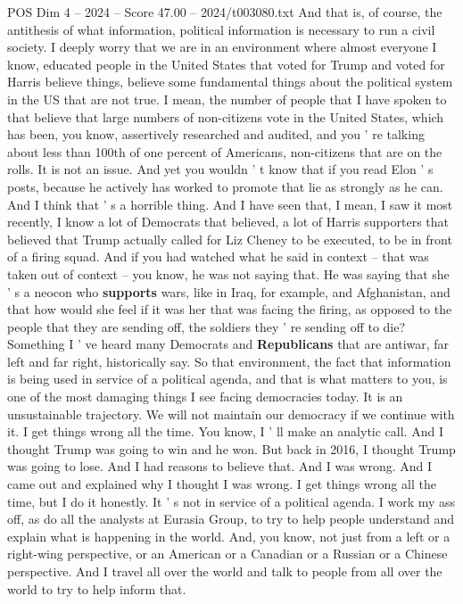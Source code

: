 \begin{textsample}{POS Dim 4 – 2024 – Score 47.00 – 2024/t003080.txt}
And that is, of course, the antithesis of what information, political information is necessary to run a civil society.
I deeply worry that we are in an environment where almost everyone I know, educated people in the United States that voted for Trump and voted for Harris believe things, believe some fundamental things about the political system in the US that are not true.
I mean, the number of people that I have spoken to that believe that large numbers of non-citizens vote in the United States, which has been, you know, assertively researched and audited, and you ' re talking about less than 100th of one percent of Americans, non-citizens that are on the rolls.
It is not an issue.
And yet you wouldn ' t know that if you read Elon ' s posts, because he actively has worked to promote that lie as strongly as he can.
And I think that ' s a horrible thing.
And I have seen that, I mean, I saw it most recently, I know a lot of Democrats that believed, a lot of Harris supporters that believed that Trump actually called for Liz Cheney to be executed, to be in front of a firing squad.
And if you had watched what he said in context -- that was taken out of context -- you know, he was not saying that.
He was saying that she ' s a neocon who \textbf{supports} wars, like in Iraq, for example, and Afghanistan, and that how would she feel if it was her that was facing the firing, as opposed to the people that they are sending off, the soldiers they ' re sending off to die?
Something I ' ve heard many Democrats and \textbf{Republicans} that are antiwar, far left and far right, historically say.
So that environment, the fact that information is being used in service of a political agenda, and that is what matters to you, is one of the most damaging things I see facing democracies today.
It is an unsustainable trajectory.
We will not maintain our democracy if we continue with it.
I get things wrong all the time.
You know, I ' ll make an analytic call.
And I thought Trump was going to win and he won.
But back in 2016, I thought Trump was going to lose.
And I had reasons to believe that.
And I was wrong.
And I came out and explained why I thought I was wrong.
I get things wrong all the time, but I do it honestly.
It ' s not in service of a political agenda.
I work my ass off, as do all the analysts at Eurasia Group, to try to help people understand and explain what is happening in the world.
And, you know, not just from a left or a right-wing perspective, or an American or a Canadian or a Russian or a Chinese perspective.
And I travel all over the world and talk to people from all over the world to try to help inform that.

\end{textsample}
